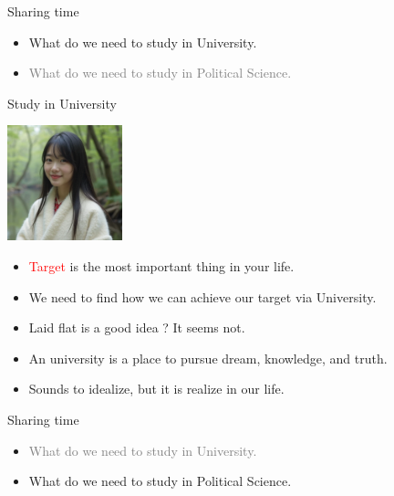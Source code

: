 \documentclass{beamer}
\begin{document}
\begin{frame}{Sharing time}
\begin{itemize}
\item What do we need to study in University.
\item \textcolor{gray}{What do we need to study in Political Science.}
\end{itemize}
\end{frame}
\begin{frame}{Study in University}
\begin{center}
\includegraphics[width=0.25\textwidth]{target.png}
\end{center}
\begin{itemize}
\item \textcolor{red}{Target} is the most important thing in your life.
\item We need to find how we can achieve our target via University.
\item Laid flat is a good idea ? It seems not.
\item An university is a place to pursue dream, knowledge, and truth.
\item Sounds to idealize, but it is realize in our life. 
\end{itemize}
\end{frame}
\begin{frame}{Sharing time}
\begin{itemize}
\item \textcolor{gray}{What do we need to study in University.}
\item What do we need to study in Political Science.
\end{itemize}
\end{frame}
\end{document}
